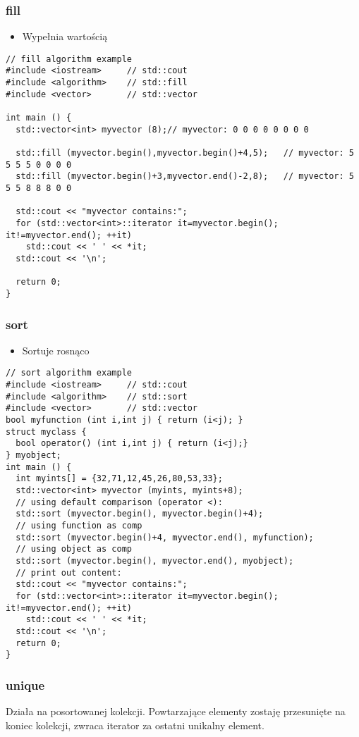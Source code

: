 \documentclass[10pt]{beamer}
\begin{document}
\begin{frame}[fragile]
  \frametitle{fill}
  \begin{itemize} 
    \item Wypełnia wartością
  \end{itemize}
  \begin{lstlisting}
// fill algorithm example
#include <iostream>     // std::cout
#include <algorithm>    // std::fill
#include <vector>       // std::vector

int main () {
  std::vector<int> myvector (8);// myvector: 0 0 0 0 0 0 0 0

  std::fill (myvector.begin(),myvector.begin()+4,5);   // myvector: 5 5 5 5 0 0 0 0
  std::fill (myvector.begin()+3,myvector.end()-2,8);   // myvector: 5 5 5 8 8 8 0 0

  std::cout << "myvector contains:";
  for (std::vector<int>::iterator it=myvector.begin(); it!=myvector.end(); ++it)
    std::cout << ' ' << *it;
  std::cout << '\n';

  return 0;
}
  \end{lstlisting}
\end{frame}

\begin{frame}[fragile]
  \frametitle{sort}
  \begin{itemize} 
    \item Sortuje rosnąco
  \end{itemize}
  \begin{lstlisting}
// sort algorithm example
#include <iostream>     // std::cout
#include <algorithm>    // std::sort
#include <vector>       // std::vector
bool myfunction (int i,int j) { return (i<j); }
struct myclass {
  bool operator() (int i,int j) { return (i<j);}
} myobject;
int main () {
  int myints[] = {32,71,12,45,26,80,53,33};
  std::vector<int> myvector (myints, myints+8); 
  // using default comparison (operator <):
  std::sort (myvector.begin(), myvector.begin()+4);
  // using function as comp
  std::sort (myvector.begin()+4, myvector.end(), myfunction);
  // using object as comp
  std::sort (myvector.begin(), myvector.end(), myobject);
  // print out content:
  std::cout << "myvector contains:";
  for (std::vector<int>::iterator it=myvector.begin(); it!=myvector.end(); ++it)
    std::cout << ' ' << *it;
  std::cout << '\n';
  return 0;
}
  \end{lstlisting}
\end{frame}

\begin{frame}
	\frametitle{unique}
	Działa na posortowanej kolekcji. Powtarzające elementy zostaję przesunięte na koniec kolekcji,
	zwraca iterator za ostatni unikalny element.
\end{frame}
\end{document}
